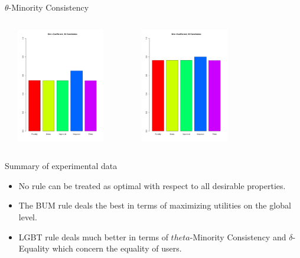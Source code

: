 \documentclass{beamer}
\begin{document}
\begin{frame}{$\theta$-Minority Consistency}
\begin{columns}
             \centering
             \includegraphics[height=5cm, width=5cm]{Gini-Coefficient, 10 Candidates.pdf}
             
	 \centering
             \includegraphics[height=5cm, width=5cm]{Gini-Coefficient, 20 Candidates.pdf}
         \end{columns} 
\end{frame}

        
       
\begin{frame}{Summary of experimental data}
	
\begin{itemize}
\item No rule can be treated as optimal with respect to all desirable properties.
\item The BUM rule deals the best in terms of maximizing utilities on the global level.

\item LGBT rule deals much better in terms of $theta$-Minority Consistency and $\delta$-Equality which concern the equality of users.
\end{itemize}
\end{frame}
\end{document}
